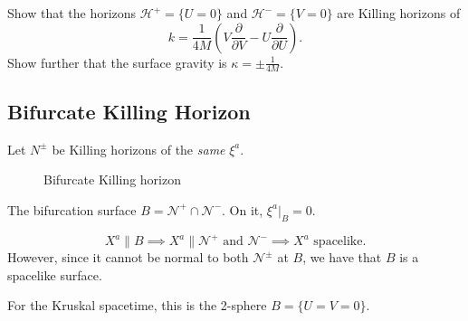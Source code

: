 \begin{exercise}[Kruskal]
  Show that the horizons $\mathcal{H}^+ = \{U = 0\}$ and $\mathcal{H}^- = \{V = 0\}$ are Killing horizons of
  \begin{equation}
    k = \frac{1}{4 M} \left( V \frac{\partial }{\partial V} - U \frac{\partial }{\partial U} \right).
  \end{equation}
  Show further that the surface gravity is $\kappa = \pm \frac{1}{4M}$.
\end{exercise}


\subsection*{Bifurcate Killing Horizon}%

Let $N^{\pm}$ be Killing horizons of the \emph{same} $\xi^{a}$.
\begin{figure}[tbhp]
  \centering
  \caption{Bifurcate Killing horizon}
  \label{fig:bifurcate-killing-horizon}
\end{figure}
The bifurcation surface $B = \mathcal{N}^+ \cap \mathcal{N}^-$.
On it, $\xi^{a}\rvert_B = 0$.

\begin{equation}
  X^{a} \parallel B \implies X^{a} \parallel \mathcal{N}^+ \text{ and } \mathcal{N}^- \implies X^{a} \text{ spacelike}.
\end{equation}
However, since it cannot be normal to both $\mathcal{N}^{\pm}$ at $B$, we have that $B$ is a spacelike surface.

\begin{example}[Kruskal]
  For the Kruskal spacetime, this is the 2-sphere $B = \{U = V = 0\}$.
\end{example}
